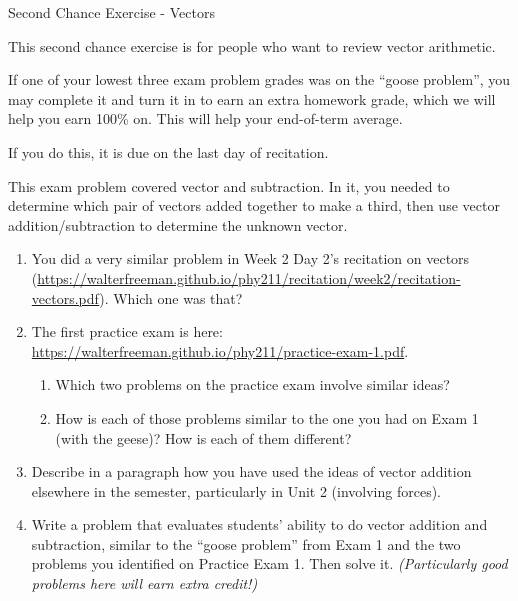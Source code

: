 \documentclass[12pt]{article}
\begin{document}
\begin{center}
\Large
\sc Second Chance Exercise - Vectors \rm





\normalsize
This second chance exercise is for people who want to review vector arithmetic. 

If one of your lowest three exam problem grades was on the ``goose problem'', you may complete it and turn it in to earn an extra homework grade, which we will help you earn 100\% on. This will help your end-of-term average.

If you do this, it is due on the last day of recitation.

\end{center}

\vspace{1.5in}

This exam problem covered vector and subtraction. In it, you needed to determine which pair of vectors added together to make a third, then use vector addition/subtraction to determine the unknown vector.

\begin{enumerate}
	\item You did a very similar problem in Week 2 Day 2's recitation on vectors (\url{https://walterfreeman.github.io/phy211/recitation/week2/recitation-vectors.pdf}). Which one was that?
	\item The first practice exam is here: \url{https://walterfreeman.github.io/phy211/practice-exam-1.pdf}. 
	\begin{enumerate}
		\item Which two problems on the practice exam involve similar ideas?
		\item How is each of those problems similar to the one you had on Exam 1 (with the geese)? How is each of them different?
	\end{enumerate}
    \item Describe in a paragraph how you have used the ideas of vector addition elsewhere in the semester, particularly in Unit 2 (involving forces). 
    \item Write a problem that evaluates students' ability to do vector addition and subtraction, similar to the ``goose problem'' from Exam 1 and the two problems you identified on Practice Exam 1. Then solve it. {\it (Particularly good problems here will earn extra credit!)}
\end{enumerate}
\end{document}
